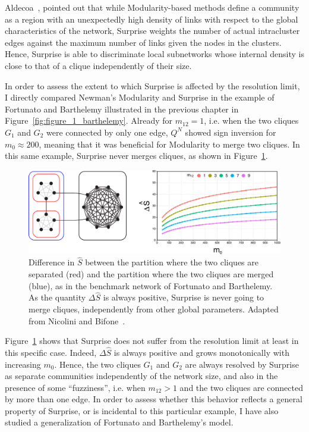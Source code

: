 Aldecoa~\cite{aldecoa2011}, pointed out that while Modularity-based methods define a community as a region with an unexpectedly high density of links with respect to the global characteristics of the network, Surprise weights the number of actual intracluster edges against the maximum number of links given the nodes in the clusters.
Hence, Surprise is able to discriminate local subnetworks whose internal density is close to that of a clique independently of their size.

In order to assess the extent to which Surprise is affected by the resolution limit, I directly compared Newman's Modularity and Surprise in the example of Fortunato and Barthelemy illustrated in the previous chapter in Figure~\ref{fig:figure_1_barthelemy}. Already for $m_{12} = 1$, i.e. when the two cliques $G_1$ and $G_2$ were connected by only one edge, $Q^N$ showed sign inversion for $m_0 \approx 200$, meaning that it was beneficial for Modularity to merge two cliques.
In this same example, Surprise never merges cliques, as shown in Figure~\ref{fig:barthelemy_surprise}.

\begin{figure}[htb!]
\centering
\includegraphics[width=1.0\textwidth]{images/barthelemy_surprise.pdf}
\caption{Difference in $\hat{S}$ between the partition where the two cliques are separated (red) and the partition where the two cliques are merged (blue), as in the benchmark network of Fortunato and Barthelemy. As the quantity $\Delta \hat{S}$ is always positive, Surprise is never going to merge cliques, independently from other global parameters. Adapted from Nicolini and Bifone~\cite{nicolini2016}.}
\label{fig:barthelemy_surprise}
\end{figure}

Figure~\ref{fig:barthelemy_surprise} shows that Surprise does not suffer from the resolution limit at least in this specific case.
Indeed, $\Delta \hat{S}$ is always positive and grows monotonically with increasing $m_0$. 
Hence, the two cliques $G_1$ and $G_2$ are always resolved by Surprise as separate communities independently of the network size, and also in the presence of some ``fuzziness'', i.e. when $m_{12}>1$ and the two cliques are connected by more than one edge.
In order to assess whether this behavior reflects a general property of Surprise, or is incidental to this particular example, I have also studied a generalization of Fortunato and Barthelemy's model.

